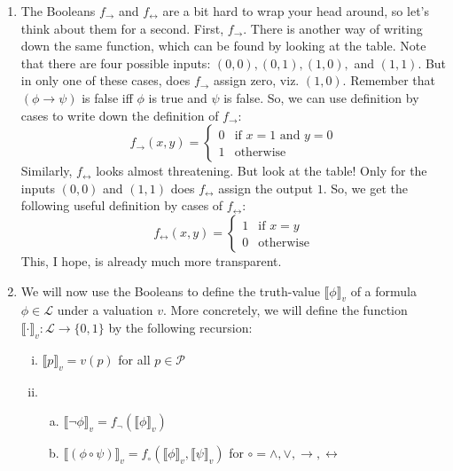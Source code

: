 \begin{enumerate}[\thesection.1]
		\item The Booleans $f_\to$ and $f_\leftrightarrow$ are a bit hard to wrap your head around, so let's think about them for a second. First, $f_\to$. There is another way of writing down the same function, which can be found by looking at the table. Note that there are four possible inputs: $(0,0), (0,1),(1,0),$ and $(1,1)$. But in only one of these cases, does $f_\to$ assign zero, viz. $(1,0)$. Remember that $(\phi\to\psi)$ is false iff $\phi$ is true and $\psi$ is false. So, we can use definition by cases to write down the definition of $f_\to$:
				\[f_\to(x,y)=\begin{cases} 0 & \text{if } x=1\text{ and }y=0\\1&\text{otherwise}\end{cases}\]
				Similarly, $f_\leftrightarrow$ looks almost threatening. But look at the table! Only for the inputs $(0,0)$ and $(1,1)$ does $f_\leftrightarrow$ assign the output $1$. So, we get the following useful definition by cases of $f_\leftrightarrow$:	
				\[f_\leftrightarrow(x,y)=\begin{cases} 1 & \text{if } x=y\\0&\text{otherwise}\end{cases}\]
		This, I hope, is already much more transparent.
		
		\item We will now use the Booleans to define the truth-value $\llbracket\phi\rrbracket_v$ of a formula $\phi\in\mathcal{L}$ under a valuation $v$. More concretely, we will define the function $\llbracket\cdot\rrbracket_v:\mathcal{L}\to\{0,1\}$ by the following recursion:
		\begin{enumerate}[(i)]
		
			\item  $\llbracket p\rrbracket_v=v(p)$ for all $p\in\mathcal{P}$
			
			\item \begin{enumerate}[(a)]
			
				\item  $\llbracket\neg \phi\rrbracket_v=f_\neg(\llbracket\phi\rrbracket_v)$
				
				\item  $\llbracket(\phi\circ \psi)\rrbracket_v=f_\circ( \llbracket\phi\rrbracket_v, \llbracket\psi\rrbracket_v)$ for $\circ=\land,\lor,\to,\leftrightarrow$
			
			\end{enumerate}
		\end{enumerate}
			

\end{enumerate}
